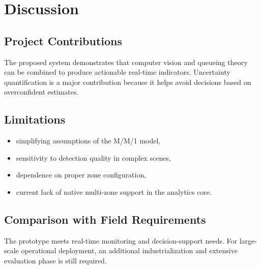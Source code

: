\chapter{Discussion}
\chaptertoc

\section{Project Contributions}
The proposed system demonstrates that computer vision and queueing theory can be combined to produce actionable real-time indicators.
Uncertainty quantification is a major contribution because it helps avoid decisions based on overconfident estimates.

\section{Limitations}
\begin{itemize}
    \item simplifying assumptions of the M/M/1 model,
    \item sensitivity to detection quality in complex scenes,
    \item dependence on proper zone configuration,
    \item current lack of native multi-zone support in the analytics core.
\end{itemize}

\section{Comparison with Field Requirements}
The prototype meets real-time monitoring and decision-support needs.
For large-scale operational deployment, an additional industrialization and extensive evaluation phase is still required.
